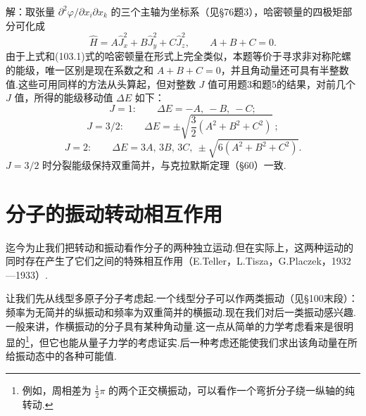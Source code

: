 \begin{xiti}
解：取张量 $\partial^2\varphi/\partial x_i\partial x_k$ 的三个主轴为坐标系（见§76题3），哈密顿量的四极矩部分可化成
\begin{equation*}
  \hat{H}=A\hat{J}_x^2+B\hat{J}_y^2+C\hat{J}_z^2,\qquad A+B+C=0.
\end{equation*}
由于上式和(103.1)式的哈密顿量在形式上完全类似，本题等价于寻求非对称陀螺的能级，唯一区别是现在系数之和 $A+B+C=0$，并且角动量还可具有半整数值.这些可用同样的方法从头算起，但对整数 $J$ 值可用题3和题5的结果，对前几个 $J$ 值，所得的能级移动值 $\Delta E$ 如下：
\begin{equation*}
  J=1:\qquad\Delta E=-A,\ -B,\ -C;
\end{equation*}
\begin{equation*}
  J=3/2:\qquad\Delta E=\pm\sqrt{\frac{3}{2}(A^2+B^2+C^2)}\ ;
\end{equation*}
\begin{equation*}
  J=2:\qquad\Delta E=3A,\,3B,\,3C,\ \pm\sqrt{6(A^2+B^2+C^2)}.
\end{equation*}
$J=3/2$ 时分裂能级保持双重简并，与克拉默斯定理（§60）一致.

\end{xiti}
\renewcommand{\theequation}{\arabic{section}.\arabic{equation}}%

\section{分子的振动转动相互作用}

迄今为止我们把转动和振动看作分子的两种独立运动.但在实际上，这两种运动的同时存在产生了它们之间的特殊相互作用（E.Teller，L.Tisza，G.Placzek，1932—1933）.

让我们先从线型多原子分子考虑起.一个线型分子可以作两类振动（见§100末段）：频率为无简并的纵振动和频率为双重简并的横振动.现在我们对后一类振动感兴趣.一般来讲，作横振动的分子具有某种角动量.这一点从简单的力学考虑看来是很明显的\footnote{例如，周相差为 $\frac{1}{2}\pi$ 的两个正交横振动，可以看作一个弯折分子绕一纵轴的纯转动.}，但它也能从量子力学的考虑证实.后一种考虑还能使我们求出该角动量在所给振动态中的各种可能值.


